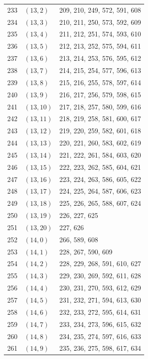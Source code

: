 \documentclass{article}
\begin{document}
\begin{longtable}{lll}
  233 & \((13, 2)\) & 209, 210, 249, 572, 591, 608 \\
  234 & \((13, 3)\) & 210, 211, 250, 573, 592, 609 \\
  235 & \((13, 4)\) & 211, 212, 251, 574, 593, 610 \\
  236 & \((13, 5)\) & 212, 213, 252, 575, 594, 611 \\
  237 & \((13, 6)\) & 213, 214, 253, 576, 595, 612 \\
  238 & \((13, 7)\) & 214, 215, 254, 577, 596, 613 \\
  239 & \((13, 8)\) & 215, 216, 255, 578, 597, 614 \\
  240 & \((13, 9)\) & 216, 217, 256, 579, 598, 615 \\
  241 & \((13, 10)\) & 217, 218, 257, 580, 599, 616 \\
  242 & \((13, 11)\) & 218, 219, 258, 581, 600, 617 \\
  243 & \((13, 12)\) & 219, 220, 259, 582, 601, 618 \\
  244 & \((13, 13)\) & 220, 221, 260, 583, 602, 619 \\
  245 & \((13, 14)\) & 221, 222, 261, 584, 603, 620 \\
  246 & \((13, 15)\) & 222, 223, 262, 585, 604, 621 \\
  247 & \((13, 16)\) & 223, 224, 263, 586, 605, 622 \\
  248 & \((13, 17)\) & 224, 225, 264, 587, 606, 623 \\
  249 & \((13, 18)\) & 225, 226, 265, 588, 607, 624 \\
  250 & \((13, 19)\) & 226, 227, 625 \\
  251 & \((13, 20)\) & 227, 626 \\
  252 & \((14, 0)\) & 266, 589, 608 \\
  253 & \((14, 1)\) & 228, 267, 590, 609 \\
  254 & \((14, 2)\) & 228, 229, 268, 591, 610, 627 \\
  255 & \((14, 3)\) & 229, 230, 269, 592, 611, 628 \\
  256 & \((14, 4)\) & 230, 231, 270, 593, 612, 629 \\
  257 & \((14, 5)\) & 231, 232, 271, 594, 613, 630 \\
  258 & \((14, 6)\) & 232, 233, 272, 595, 614, 631 \\
  259 & \((14, 7)\) & 233, 234, 273, 596, 615, 632 \\
  260 & \((14, 8)\) & 234, 235, 274, 597, 616, 633 \\
  261 & \((14, 9)\) & 235, 236, 275, 598, 617, 634 \\

\end{longtable}
\end{document}
